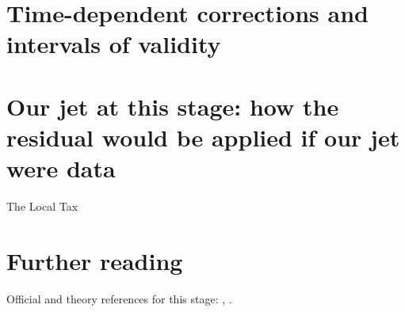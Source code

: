 \section{Time-dependent corrections and intervals of validity}
\label{sec:local_tax:time_dependent_corrections_and_intervals}

\section{Our jet at this stage: how the residual would be applied if our jet were data}
\label{sec:local_tax:our_jet_at_this_stage_how_the_residual_w}

\begin{ledger}{The Local Tax}
\end{ledger}

\section{Further reading}
\label{sec:local_tax:further_reading}
Official and theory references for this stage: \cite{CMS:2016lmd}, \cite{CMS:2011krm}.

\begin{pitfalls}
\end{pitfalls}

\begin{exercises}
\item {}
\item {}
\end{exercises}

